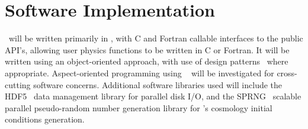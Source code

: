 \documentclass[11pt,letterpaper]{article}
\begin{document}
% 
% 

\section{Software Implementation} \label{s:implementation}

\cello\ will be written primarily in \cpp, with C and Fortran callable
interfaces to the public API's, allowing user physics functions to be
written in C or Fortran.  It will be written using an object-oriented
approach, with use of design patterns~\cite{BuHe07,GaHe95} where
appropriate.  Aspect-oriented programming using
~\cite{wwwaspectcpp} will be investigated for
cross-cutting software concerns.  Additional software libraries used
will include the HDF5~\cite{wwwhdf5} data management library for
parallel disk I/O, and the SPRNG~\cite{MaSr00} scalable parallel
pseudo-random number generation library for \enzoii's cosmology
initial conditions generation.
\end{document}
